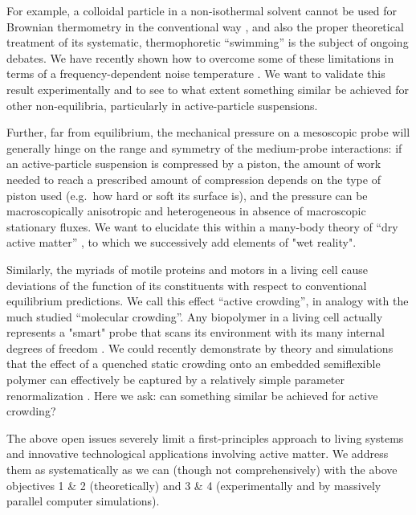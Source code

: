 \begin{workpackage}
\begin{wpdescription}
For example, a colloidal particle in a non-isothermal solvent cannot be used for Brownian thermometry 
in the conventional way \cite{rings-etal:2010,kroy:2014}, and also the proper theoretical 
treatment of its systematic, thermophoretic ``swimming'' is the subject of ongoing debates.
%
We have recently shown how to overcome some of these limitations in terms of a frequency-dependent noise 
temperature \cite{falasco-etal:2014}.
%
We want to validate this result experimentally and to see to what extent something similar be achieved for other 
non-equilibria, particularly in active-particle suspensions.

Further, far from equilibrium, the mechanical pressure on a mesoscopic probe will generally hinge on the range and 
symmetry of the medium-probe interactions: if an active-particle suspension is compressed by a piston, the
amount of work needed to reach a prescribed amount of compression depends on the type of
piston used (e.g.\ how hard or soft its surface is), and the pressure can be macroscopically
anisotropic and heterogeneous in absence of macroscopic stationary fluxes. 
%
We want to elucidate this within a many-body theory of ``dry active matter'' \cite{marchetti-etal:2013}, 
to which we successively add elements of "wet reality".

Similarly, the myriads of motile proteins and motors in a living cell cause deviations of the function
of its constituents with respect to conventional equilibrium predictions.  We call this
effect ``active crowding'', in analogy with the much studied ``molecular crowding''. 
%
Any biopolymer in a living cell actually represents a "smart" probe that scans its environment with its many 
internal degrees of freedom \cite{otto-etal:2013}.
%
We could recently demonstrate by theory and simulations that the effect of a quenched static crowding onto an embedded
semiflexible polymer can effectively be captured by a relatively simple parameter renormalization \cite{schoebl-etal:2014}.  
%
Here we ask: can something similar be achieved for active crowding?

The above open issues severely limit a first-principles approach to living systems and
innovative technological applications involving active matter.
%
We address them as systematically as we can (though not comprehensively) with the above
objectives 1 \& 2 (theoretically) and 3 \& 4 (experimentally and by massively parallel
computer simulations).

\end{wpdescription}


\end{workpackage}
